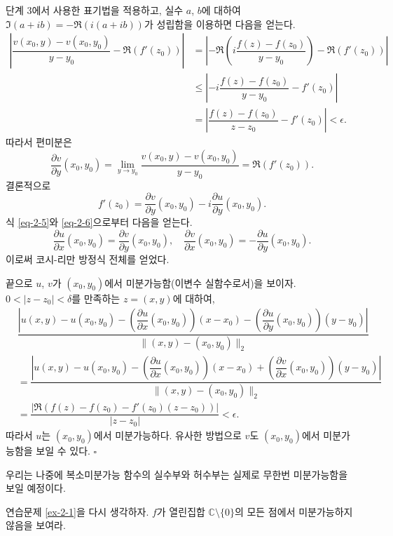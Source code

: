 단계 3에서 사용한 표기법을 적용하고,
실수 $a$, $b$에 대하여
$\Im(a+ib) = -\Re(i(a+ib))$가 성립함을 이용하면 다음을 얻는다.
\begin{align*}
\left| \dfrac{v(x_0,y) - v(x_0, y_0)}{y-y_0} - \Re(f'(z_0)) \right| 
&= \left| -\Re\left( i\dfrac{f(z)-f(z_0)}{y-y_0}\right) - \Re(f'(z_0)) \right| \\
&\le \left| -i\dfrac{f(z)-f(z_0)}{y-y_0} - f'(z_0) \right| \\
&= \left| \dfrac{f(z)-f(z_0)}{z-z_0} - f'(z_0) \right| < \epsilon .
\end{align*}
따라서 편미분은
$$
\dfrac{\partial v}{\partial y}(x_0, y_0) 
= \lim\limits_{y\to y_0} \dfrac{v(x_0,y) - v(x_0, y_0)}{y-y_0} 
= \Re(f'(z_0)).
$$
결론적으로
\begin{equation}\label{eq-2-6}
f'(z_0) = \dfrac{\partial v}{\partial y}(x_0, y_0) 
- i \dfrac{\partial u}{\partial y}(x_0, y_0).
\end{equation}
식 \eqref{eq-2-5}와 \eqref{eq-2-6}으로부터 다음을 얻는다.
$$
\dfrac{\partial u}{\partial x}(x_0, y_0) = \dfrac{\partial v}{\partial y}(x_0, y_0),
\quad
\dfrac{\partial v}{\partial x}(x_0, y_0) = - \dfrac{\partial u}{\partial y}(x_0, y_0).
$$
이로써 코시-리만 방정식 전체를 얻었다.

끝으로 $u$, $v$가 $(x_0, y_0)$에서 미분가능함(이변수 실함수로서)을 보이자.\\
$0<|z-z_0|<\delta$를 만족하는 $z=(x,y)$에 대하여,
\begin{align*}
& \dfrac{\left| u(x,y) - u(x_0,y_0) 
- \left( \dfrac{\partial u}{\partial x}(x_0,y_0)\right)(x - x_0)
- \left( \dfrac{\partial u}{\partial y}(x_0,y_0)\right)(y - y_0) \right|}
{\| (x,y) - (x_0,y_0)\|_2} \\
&= \dfrac{\left| u(x,y) - u(x_0,y_0) 
- \left( \dfrac{\partial u}{\partial x}(x_0,y_0)\right)(x - x_0)
+ \left( \dfrac{\partial v}{\partial x}(x_0,y_0)\right)(y - y_0) \right|}
{\| (x,y) - (x_0,y_0)\|_2} \\
&= \dfrac{|\Re(f(z) - f(z_0) - f'(z_0)(z-z_0))|}{|z-z_0|} < \epsilon.
\end{align*}
따라서 $u$는 $(x_0, y_0)$에서 미분가능하다.
유사한 방법으로 $v$도 $(x_0, y_0)$에서 미분가능함을 보일 수 있다.
\hfill $\square$

\begin{salt_remark}\label{remark-2-2}
우리는 나중에 복소미분가능 함수의 실수부와 허수부는 실제로
무한번 미분가능함을 보일 예정이다.
\end{salt_remark}

\begin{salt_exercise}\label{ex-2-9}
연습문제 \ref{ex-2-1}을 다시 생각하자.
$f$가 열린집합 $\mathbb C\setminus \{0\}$의 모든 점에서 미분가능하지 않음을 보여라.
\end{salt_exercise}

